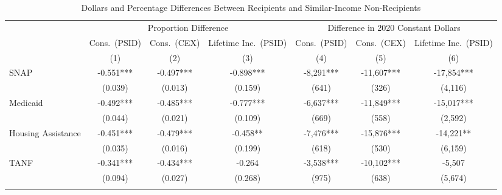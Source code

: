 \begin{table}[h!]
    \centering\small
    \caption{Dollars and Percentage Differences Between Recipients and Similar-Income Non-Recipients}
    \label{tab:levels_outcomes}
\begin{tabular*}{1.36\textwidth}{@{\extracolsep{\fill}}lcccccc}
    \toprule
                   & \multicolumn{3}{c}{Proportion Difference}                       & \multicolumn{3}{c}{Difference in  2020 Constant Dollars}\\ \cmidrule{2-4}\cmidrule{5-7}
                   & Cons.\ (PSID)      & Cons.\ (CEX)                 & Lifetime Inc.\  (PSID)                & Cons.\ (PSID)           & Cons.\ (CEX)                              & Lifetime Inc.\ (PSID)                                   \\
                   & (1)                          & (2)                              & (3)                                            & (4)                     & (5)                     & (6)                                                     \\ \midrule  \addlinespace
SNAP               & -0.551***   & -0.497***    & -0.898***     & -8,291***          & -11,607***                     & -17,854***                       \\
                   & (0.039)   & (0.013)    & (0.159)     & (641)         & (326)                        & (4,116)                       \\ \addlinespace
Medicaid           & -0.492*** & -0.485*** & -0.777*** & -6,637***     & -11,849***                   & -15,017***                   \\
                   & (0.044)  & (0.021) & (0.109) & (669)     & (558)                    & (2,592)                   \\  \addlinespace
Housing Assistance & -0.451***    & -0.479***       & -0.458**       & -7,476***        & -15,876***                        & -14,221**                         \\
                   & (0.035)    & (0.016)     & (0.199)       & (618)         & (530)                         & (6,159)                         \\  \addlinespace
TANF               & -0.341***    & -0.434***     & -0.264     & -3,538***      & -10,102***                    & -5,507                       \\
                   & (0.094)   & (0.027)    & (0.268)     & (975)          & (638)                 & (5,674)                       \\  \addlinespace

\end{tabular*}
\end{table}

